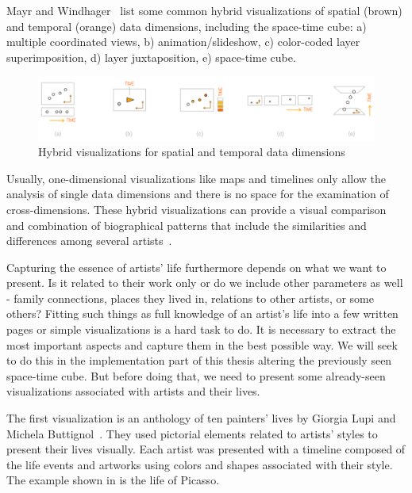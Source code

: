 Mayr and Windhager~\citep{mayr2018once} list some common hybrid visualizations of spatial (brown) and temporal (orange) data dimensions,
including the space-time cube: a) multiple coordinated views, b) animation/slideshow, c) color-coded layer superimposition, d) layer
juxtaposition, e) space-time cube.

\begin{figure}[hbt!]
    \begin{center}
        \includegraphics[width=\textwidth]{graphics/2-literature-review/23}
    \end{center}
    \caption{Hybrid visualizations for spatial and temporal data dimensions}
    \label{fig:figure2.23}
\end{figure}

Usually, one-dimensional visualizations like maps and timelines only allow the analysis of single data dimensions and there is no space for
the examination of cross-dimensions. These hybrid visualizations can provide a visual comparison and combination of biographical patterns that
include the similarities and differences among several artists~\citep{windhager2017beyond}.

Capturing the essence of artists’ life furthermore depends on what we want to present. Is it related to their work only or do we include other
parameters as well - family connections, places they lived in, relations to other artists, or some others? Fitting such things as full knowledge of
an artist’s life into a few written pages or simple visualizations is a hard task to do. It is necessary to extract the most important aspects and
capture them in the best possible way. We will seek to do this in the implementation part of this thesis altering the previously seen space-time
cube. But before doing that, we need to present some already-seen visualizations associated with artists and their lives.

The first visualization is an anthology of ten painters’ lives by Giorgia Lupi and Michela Buttignol~\citep{lupi_buttignol}. They used
pictorial elements related to artists’ styles to present their lives visually. Each artist was presented with a timeline composed of the life
events and artworks using colors and shapes associated with their style. The example shown in  is the life of Picasso.

